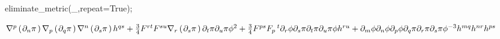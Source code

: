 \documentclass[10pt]{article}
\newcommand\brwrap[3]{%
  \setbox0=\hbox{$#2$}
  \left#1\vbox to \the\ht0{\hbox to 0pt{}}\right.\kern-.2em
  \begingroup #2\endgroup\kern-.15em
  \left.\vbox to \the\ht0{\hbox to 0pt{}}\right#3
}
\begin{document}
\begin{python}
eliminate_metric(_,repeat=True);
\end{python}
\begin{adjustwidth}{1em}{0cm}${}\nabla^{p}\brwrap{(}{\partial_{n}{\pi}}{)} \nabla_{p}\brwrap{(}{\partial_{q}{\pi}}{)} \nabla^{n}\brwrap{(}{\partial_{s}{\pi}}{)} h^{q s}+\frac{3}{4}F^{r t} F^{s u} \nabla_{r}\brwrap{(}{\partial_{s}{\pi}}{)} \partial_{t}{\pi} \partial_{u}{\pi} {\phi}^{2}+\frac{3}{4}F^{p s} F_{p}\,^{t} \partial_{r}{\phi} \partial_{s}{\pi} \partial_{t}{\pi} \partial_{u}{\pi} \phi h^{r u}+\partial_{m}{\phi} \partial_{n}{\phi} \partial_{p}{\phi} \partial_{q}{\pi} \partial_{r}{\pi} \partial_{s}{\pi} {\phi}^{-3} h^{m q} h^{n r} h^{p s}$\end{adjustwidth}
\begin{python}
\end{python}
\end{document}
